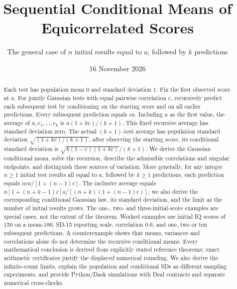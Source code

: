 
\renewcommand{\ProjectReportRunningTitle}{Sequential conditional means}
\renewcommand{\ProjectReportRunningSubtitle}{Derivation and assumptions}
\title{Sequential Conditional Means of Equicorrelated Scores}
\subtitle{The general case of \(n\) initial results equal to \(a\), followed by \(k\) predictions}
\author{\ProjectAuthor}
\date{16 November 2026}

\renewcommand{\ProjectReportHighlights}{With \(n\) equal initial observations \(a\), each subsequent
Gaussian conditional-mean prediction is \(nca/[1+(n-1)c]\) where the
conditioning covariance is nonsingular. The recursively filled average
is deterministic; averages of actual outcomes have nonzero uncertainty.}


\frontmatter
\ProjectReportTitlePage
\begin{abstract}
Each test has population mean \(0\) and standard deviation \(1\). Fix the
first observed score at \(a\). For jointly Gaussian tests with equal
pairwise correlation \(c\), recursively predict each subsequent test by
conditioning on the starting score and on all earlier predictions.
Every subsequent prediction equals \(ca\). Including \(a\) as the first
value, the average of \(a,e_1,\ldots,e_k\) is
\(a(1+kc)/(k+1)\). This fixed recursive average has standard deviation zero.
The actual \((k+1)\)-test average has population standard deviation
\(\sqrt{(1+kc)/(k+1)}\); after observing the starting score, its conditional
standard deviation is \(\sqrt{k(1-c)(1+kc)}/(k+1)\).
We derive the Gaussian conditional mean, solve the recursion,
describe the admissible correlations and singular endpoints, and distinguish
these sources of variation. More generally, for any integer \(n\geq1\)
initial test results all equal to \(a\), followed by \(k\geq1\) predictions,
each prediction equals \(nca/[1+(n-1)c]\). The inclusive average equals
\(n[1+(n+k-1)c]a/[(n+k)(1+(n-1)c)]\); we also derive the
corresponding conditional Gaussian law, its standard deviation, and the
limit as the number of initial results grows. The one-, two- and
three-initial-score examples are special cases, not the extent of the theorem. Worked examples use initial IQ scores of 150 on a
mean-100, SD-15 reporting scale, correlation \(0.6\), and one, two or ten
subsequent predictions. A counterexample shows that means, variances and
correlations alone do not determine the recursive conditional means.
Every mathematical conclusion is derived from explicitly stated reference
theorems; exact arithmetic certificates justify the displayed numerical rounding.
We also derive the infinite-count limits, explain the population and conditional
SDs as different sampling experiments, and provide Python/Dask
simulations with Deal contracts and separate numerical cross-checks.
\end{abstract}

